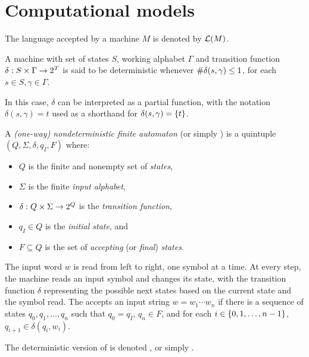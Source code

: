 \chapter{Computational models}
The language accepted by a machine $M$ is denoted by $\mathcal L(M)$.


\begin{defn}
	A machine with set of states $S$, working alphabet $\Gamma$ and transition function $\delta:S\times\Gamma\to2^{T}$ is said to be deterministic whenever $\# \delta(s,\gamma)\le1$, for each $s\in S,\gamma\in\Gamma$.

	In this case, $\delta$ can be interpreted as a partial function, with the notation $\delta(s,\gamma)=t$ used as a shorthand for $\delta(s,\gamma)=\{t\}$.
\end{defn}

\begin{defn}
	A \emph{(one-way) nondeterministic finite automaton} (\ONFA or simply \NFA) is a quintuple $(Q,\Sigma,\delta,q_I,F)$ where:
	\begin{itemize}
		\item $Q$ is the finite and nonempty set of \emph{states},
		\item $\Sigma$ is the finite \emph{input alphabet},
		\item $\delta:Q\times\Sigma\to2^{Q}$ is the \emph{transition function},
		\item $q_I\in Q$ is the \emph{initial state}, and
		\item $F\subseteq Q$ is the set of \emph{accepting} (or \emph{final}) \emph{states}.
	\end{itemize}
	The input word $w$ is read from left to right, one symbol at a time.
	At every step, the machine reads an input symbol and changes its state, with the transition function $\delta$ representing the possible next states based on the current state and the symbol read.
	The \NFA accepts an input string $w=w_1\cdots w_n$ if there is a sequence of states $q_0,q_1,\dots,q_n$ such that $q_0=q_I$, $q_n\in F$, and for each $i\in\{0,1,\dots,n-1\}$, $q_{i+1}\in\delta(q_i,w_i)$.

	The deterministic version of \ONFA is denoted \ODFA, or simply \DFA.
\end{defn}



